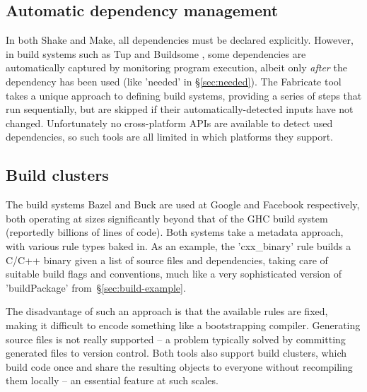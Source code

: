\subsection{Automatic dependency management}

In both Shake and Make, all dependencies must be declared explicitly. However,
in build systems such as Tup \cite{tup} and Buildsome \cite{buildsome}, some
dependencies are automatically captured by monitoring program execution, albeit
only \emph{after} the dependency has been used (like \lst'needed' in
\S\ref{sec:needed}). The Fabricate tool \cite{fabricate} takes a unique approach
to defining build systems, providing a series of steps that run sequentially,
but are skipped if their automatically-detected inputs have not changed.
Unfortunately no cross-platform APIs are available to detect used dependencies,
so such tools are all limited in which platforms they support.

\subsection{Build clusters}

The build systems Bazel and Buck \cite{buck} are used at Google and Facebook
respectively, both operating at sizes significantly beyond that of the GHC build
system (reportedly billions of lines of code). Both systems take a metadata
approach, with various rule types baked in. As an example, the \lst'cxx_binary'
rule builds a C/C++ binary given a list of source files and dependencies,
taking care of suitable build flags and conventions, much like a very sophisticated
version of \lst'buildPackage' from~\S\ref{sec:build-example}.

The disadvantage of such an approach is that the available rules are fixed,
making it difficult to encode something like a bootstrapping compiler.
Generating source files is not really supported -- a problem typically solved by
committing generated files to version control. Both tools also support build
clusters, which build code once and share the resulting objects to everyone
without recompiling them locally -- an essential feature at such scales.
